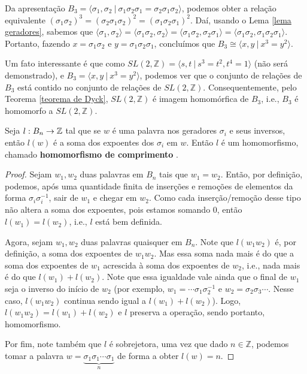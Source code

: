 	\par\vspace{0.3cm} Da apresentação $B_3 = \langle \sigma_1,\sigma_2 \ | \ \sigma_1\sigma_2\sigma_1 
	= \sigma_2\sigma_1\sigma_2 \rangle$, podemos obter a relação equivalente 
	$(\sigma_1\sigma_2)^3 = (\sigma_2\sigma_1\sigma_2)^2 = (\sigma_1\sigma_2\sigma_1)^2$. Daí, usando 
	o Lema \ref{lema geradores}, sabemos que $\langle \sigma_1,\sigma_2 \rangle 
	= \langle \sigma_1\sigma_2,\sigma_2 \rangle = \langle \sigma_1\sigma_2, \sigma_2\sigma_1 \rangle 
	= \langle \sigma_1\sigma_2, \sigma_1\sigma_2\sigma_1 \rangle$. Portanto, fazendo 
	$x = \sigma_1\sigma_2$ e $y = \sigma_1\sigma_2\sigma_1$, concluímos que 
	$B_3 \cong \langle x,y \ | \ x^3=y^2 \rangle$.
	\begin{remark}
		Um fato interessante é que como $SL(2,\mathbb{Z}) = \langle s,t \ | \ s^3 = t^2, t^4 = 1 \rangle$ 
		(não será demonstrado), e $B_3 = \langle x,y \ | \ x^3 = y^2 \rangle$, podemos ver que o conjunto de 
		relações de $B_3$ está contido no conjunto de relações de $SL(2,\mathbb{Z})$. Consequentemente, 
		pelo Teorema \ref{teorema de Dyck}, $SL(2,\mathbb{Z})$ é imagem homomórfica de $B_3$, i.e., 
		$B_3$ é homomorfo a $SL(2,\mathbb{Z})$. 
	\end{remark}
	\begin{lemma}
	\label{homomorfismo de comprimento}
		Seja $l:B_n \to \mathbb{Z}$ tal que se $w$ é uma palavra nos geradores $\sigma_i$ e seus inversos, 
		então $l(w)$ é a soma dos expoentes 
		dos $\sigma_i$ em $w$. Então $l$ é um homomorfismo, chamado {\bf homomorfismo de comprimento}
		.
	\end{lemma}
	\begin{proof}
		Sejam $w_1,w_2$ duas palavras em $B_n$ tais que $w_1=w_2$. Então, por definição, podemos, 
		após uma quantidade finita de inserções e remoções de elementos da forma $\sigma_i\sigma_i^{-1}$, 
		sair de $w_1$ e chegar em $w_2$. Como cada inserção/remoção desse tipo não altera a soma dos expoentes,
		pois estamos somando 0, então $l(w_1)=l(w_2)$, i.e., $l$ está bem definida. 
		
		\par\vspace{0.3cm} Agora, sejam $w_1,w_2$ duas palavras quaisquer em $B_n$. Note que $l(w_1w_2)$ é, 
		por definição, a soma dos expoentes de $w_1w_2$. Mas essa soma nada mais é do que a soma dos expoentes 
		de $w_1$ acrescida à soma dos expoentes de $w_2$, i.e., nada mais é do que $l(w_1)+l(w_2)$. Note que 
		essa igualdade vale ainda que o final de $w_1$ seja o inverso do início de $w_2$ (por exemplo, 
		$w_1 = \cdots\sigma_1\sigma_2^{-1}$ e $w_2 = \sigma_2\sigma_3\cdots$. Nesse caso, $l(w_1w_2)$ 
		continua sendo igual a $l(w_1) + l(w_2)$). Logo, $l(w_1w_2)=l(w_1)+l(w_2)$ e $l$ preserva a operação, 
		sendo portanto, homomorfismo.
		
		\par\vspace{0.3cm} Por fim, note também que $l$ é sobrejetora, uma vez que dado $n\in\mathbb{Z}$, 
		podemos tomar a palavra $w = \underbrace{\sigma_1\sigma_1\cdots\sigma_1}_{n}$ de forma a obter $l(w) = n$.
	\end{proof}
